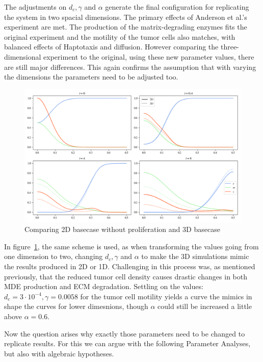 The adjustments on $d_c,\gamma$ and $\alpha$ generate the final configuration for replicating the system in two spacial dimensions. The primary effects of Anderson et al.'s experiment are met. The production of the matrix-degrading enzymes fits the original experiment and the motility of the tumor cells also matches, with balanced effects of Haptotaxis and diffusion. However comparing the three-dimensional experiment to the original, using these new parameter values, there are still major differences. This again confirms the assumption that with varying the dimensions the parameters need to be adjusted too.

\begin{figure}[h!]
    \centering
    \includegraphics[width=\textwidth]{resources/images/basecase_replication.png}
    \caption{Comparing 2D basecase without proliferation and 3D basecase}
    \label{fig:3D_basecase_comparison}
\end{figure}

In figure~\ref{fig:3D_basecase_comparison}, the same scheme is used, as when transforming the values going from one dimension to two, changing $d_c,\gamma$ and $\alpha$ to make the 3D simulations mimic the results produced in 2D or 1D. Challenging in this process was, as mentioned previously, that the reduced tumor cell density causes drastic changes in both MDE production and ECM degradation. Settling on the values: $d_c=3 \cdot 10^{-4}, \gamma=0.0058$ for the tumor cell motility yields a curve the mimics in shape the curves for lower dimesnions, though $\alpha$ could still be increased a little above $\alpha=0.6$.

Now the question arises why exactly those parameters need to be changed to replicate results. For this we can argue with the following Parameter Analyses, but also with algebraic hypotheses. 

